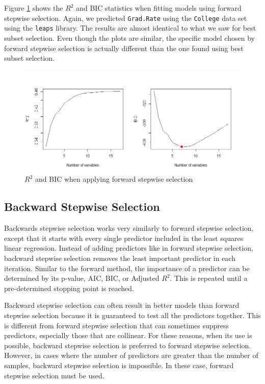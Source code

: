 \documentclass{article}
\begin{document}
Figure \ref{fig:forward-stepwise-selection} shows the $R^2$ and BIC statistics when fitting models using forward stepwise selection. Again, we predicted \lstinline!Grad.Rate! using the \lstinline!College! data set using the \lstinline!leaps! library. The results are almost identical to what we saw for best subset selection. Even though the plots are similar, the specific model chosen by forward stepwise selection is actually different than the one found using best subset selection.

\begin{figure}[!h]
	\label{fig:forward-stepwise-selection}
	\centering
	\caption{$R^2$ and BIC when applying forward stepwise selection}
	\includegraphics[width = 6in]{forward-stepwise-selection.png}
\end{figure}

\subsection{Backward Stepwise Selection}
Backwards stepwise selection works very similarly to forward stepwise selection, except that it starts with every single predictor included in the least squares linear regression. Instead of adding predictors like in forward stepwise selection, backward stepwise selection removes the least important predictor in each iteration. Similar to the forward method, the importance of a predictor can be determined by its p-value, AIC, BIC, or Adjusted $R^2$. This is repeated until a pre-determined stopping point is reached.

Backward stepwise selection can often result in better models than forward stepwise selection because it is guaranteed to test all the predictors together. This is different from forward stepwise selection that can sometimes suppress predictors, especially those that are collinear. For these reasons, when its use is possible, backward stepwise selection is preferred to forward stepwise selection. However, in cases where the number of predictors are greater than the number of samples, backward stepwise selection is impossible. In these case, forward stepwise selection must be used.
\end{document}
